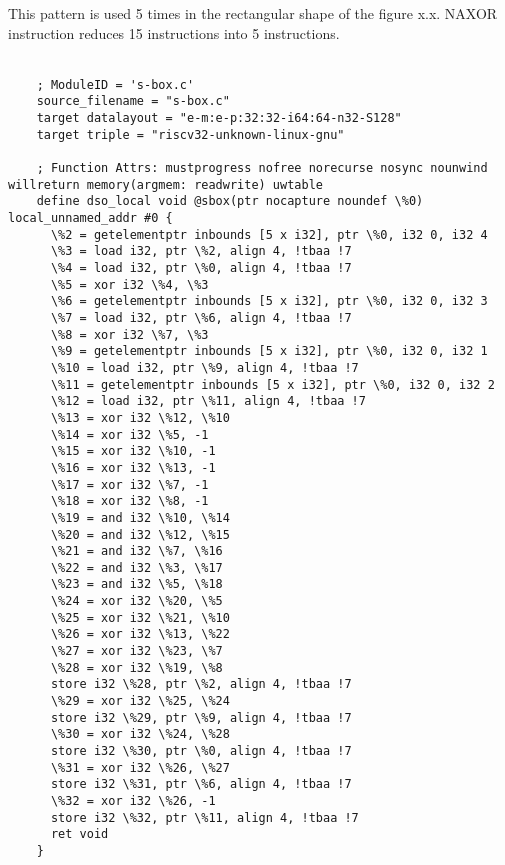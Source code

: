 This pattern is used 5 times in the rectangular shape of the figure x.x. NAXOR instruction reduces 15 instructions into 5 instructions.
\\\\
%
%

\begin{lstlisting}
    ; ModuleID = 's-box.c'
    source_filename = "s-box.c"
    target datalayout = "e-m:e-p:32:32-i64:64-n32-S128"
    target triple = "riscv32-unknown-linux-gnu"
    
    ; Function Attrs: mustprogress nofree norecurse nosync nounwind willreturn memory(argmem: readwrite) uwtable
    define dso_local void @sbox(ptr nocapture noundef \%0) local_unnamed_addr #0 {
      \%2 = getelementptr inbounds [5 x i32], ptr \%0, i32 0, i32 4
      \%3 = load i32, ptr \%2, align 4, !tbaa !7
      \%4 = load i32, ptr \%0, align 4, !tbaa !7
      \%5 = xor i32 \%4, \%3
      \%6 = getelementptr inbounds [5 x i32], ptr \%0, i32 0, i32 3
      \%7 = load i32, ptr \%6, align 4, !tbaa !7
      \%8 = xor i32 \%7, \%3
      \%9 = getelementptr inbounds [5 x i32], ptr \%0, i32 0, i32 1
      \%10 = load i32, ptr \%9, align 4, !tbaa !7
      \%11 = getelementptr inbounds [5 x i32], ptr \%0, i32 0, i32 2
      \%12 = load i32, ptr \%11, align 4, !tbaa !7
      \%13 = xor i32 \%12, \%10
      \%14 = xor i32 \%5, -1
      \%15 = xor i32 \%10, -1
      \%16 = xor i32 \%13, -1
      \%17 = xor i32 \%7, -1
      \%18 = xor i32 \%8, -1
      \%19 = and i32 \%10, \%14
      \%20 = and i32 \%12, \%15
      \%21 = and i32 \%7, \%16
      \%22 = and i32 \%3, \%17
      \%23 = and i32 \%5, \%18
      \%24 = xor i32 \%20, \%5
      \%25 = xor i32 \%21, \%10
      \%26 = xor i32 \%13, \%22
      \%27 = xor i32 \%23, \%7
      \%28 = xor i32 \%19, \%8
      store i32 \%28, ptr \%2, align 4, !tbaa !7
      \%29 = xor i32 \%25, \%24
      store i32 \%29, ptr \%9, align 4, !tbaa !7
      \%30 = xor i32 \%24, \%28
      store i32 \%30, ptr \%0, align 4, !tbaa !7
      \%31 = xor i32 \%26, \%27
      store i32 \%31, ptr \%6, align 4, !tbaa !7
      \%32 = xor i32 \%26, -1
      store i32 \%32, ptr \%11, align 4, !tbaa !7
      ret void
    }
    

\end{lstlisting}
